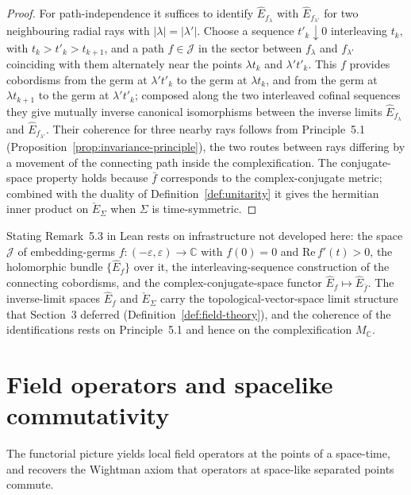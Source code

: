 \begin{proof}
  For path-independence it suffices to identify $\hat E_{f_{\lambda}}$ with
  $\hat E_{f_{\lambda'}}$ for two neighbouring radial rays with
  $|\lambda| = |\lambda'|$. Choose a sequence $t'_k \downarrow 0$ interleaving $t_k$,
  with $t_k > t'_k > t_{k+1}$, and a path $f \in \mathcal J$ in the sector between
  $f_{\lambda}$ and $f_{\lambda'}$ coinciding with them alternately near the points
  $\lambda t_k$ and $\lambda' t'_k$. This $f$ provides cobordisms from the germ at
  $\lambda' t'_k$ to the germ at $\lambda t_k$, and from the germ at $\lambda t_{k+1}$
  to the germ at $\lambda' t'_k$; composed along the two interleaved cofinal sequences
  they give mutually inverse canonical isomorphisms between the inverse limits
  $\hat E_{f_{\lambda}}$ and $\hat E_{f_{\lambda'}}$. Their coherence for three nearby
  rays follows from Principle~5.1 (Proposition~\ref{prop:invariance-principle}), the
  two routes between rays differing by a movement of the connecting path inside the
  complexification. The conjugate-space property holds because $\bar f$ corresponds to
  the complex-conjugate metric; combined with the duality of
  Definition~\ref{def:unitarity} it gives the hermitian inner product on
  $\check E_{\Sigma}$ when $\Sigma$ is time-symmetric.
\end{proof}

Stating Remark~5.3 in Lean rests on infrastructure not developed here: the space
$\mathcal J$ of embedding-germs $f \colon (-\varepsilon, \varepsilon) \to \mathbb C$
with $f(0) = 0$ and $\mathrm{Re}\, f'(t) > 0$, the holomorphic bundle $\{\hat E_f\}$
over it, the interleaving-sequence construction of the connecting cobordisms, and the
complex-conjugate-space functor $\hat E_f \mapsto \hat E_{\bar f}$. The inverse-limit
spaces $\hat E_f$ and $\check E_{\Sigma}$ carry the topological-vector-space limit
structure that Section~3 deferred (Definition~\ref{def:field-theory}), and the
coherence of the identifications rests on Principle~5.1 and hence on the
complexification $M_{\mathbb C}$.

\section{Field operators and spacelike commutativity}

The functorial picture yields local field operators at the points of a space-time, and
recovers the Wightman axiom that operators at space-like separated points commute.


